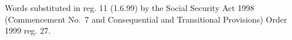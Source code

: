 \documentclass[12pt,a4paper]{article}
\begin{document}
{{Words substituted in reg. 11 (1.6.99) by the Social Security Act 1998 (Commencement No.\ 7 and Consequential and Transitional Provisions) Order 1999 reg. 27.
}

}
\end{document}
